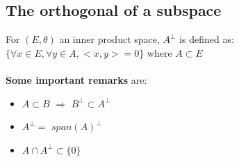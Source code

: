 \documentclass{article}
\begin{document}
\subsection{The orthogonal of a subspace}
For $(E, \theta)$ an inner product space, $A^{\perp}$ is defined as:\\
$\{ \forall x \in E, \forall y \in A, <x,y> = 0\}$ where $A \subset E$\\
\\
\textbf{Some important remarks} are:\\
\begin{itemize}
    \item $A \subset B$ $\Rightarrow$ $B^{\perp} \subset A^{\perp}$
    \item $A^{\perp} = $ $span(A)^{\perp}$
    \item $A \cap A^{\perp} \subset \{ 0 \} $
\end{itemize}
\end{document}
